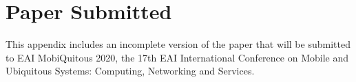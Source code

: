 \chapter{Paper Submitted} \label{ap:paper_mobiquituous}

This appendix includes an incomplete version of the paper that will be submitted to EAI MobiQuitous 2020, the 17th EAI International Conference on Mobile and Ubiquitous Systems: Computing, Networking and Services.

